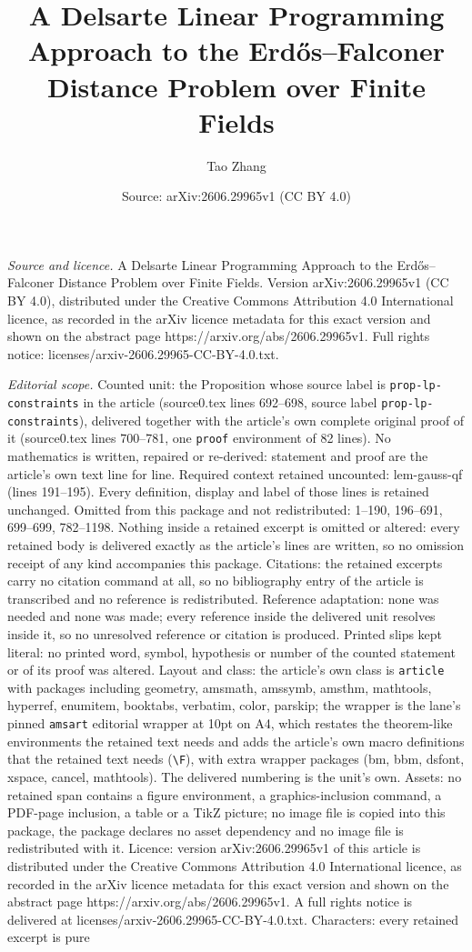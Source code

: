 \documentclass[10pt,a4paper]{amsart}
\title[A Delsarte Linear Programming Approach to the Erd\H{o}s--Fal]{A Delsarte Linear Programming Approach to the Erd\H{o}s--Falconer Distance Problem over Finite Fields}
\author{Tao Zhang}
\date{Source: arXiv:2606.29965v1 (CC BY 4.0)}
\begin{document}
\maketitle

\noindent\emph{Source and licence.} A Delsarte Linear Programming Approach to the Erd\H{o}s--Falconer Distance Problem over Finite Fields. Version arXiv:2606.29965v1 (CC BY 4.0), distributed under the Creative Commons Attribution 4.0 International licence, as recorded in the arXiv licence metadata for this exact version and shown on the abstract page https://arxiv.org/abs/2606.29965v1. Full rights notice: licenses/arxiv-2606.29965-CC-BY-4.0.txt.\par\smallskip

\noindent\textit{Editorial scope.} Counted unit: the Proposition whose source label is \texttt{prop-lp-constraints} in the article (source0.tex lines 692--698, source label \texttt{prop-lp-constraints}), delivered together with the article's own complete original proof of it (source0.tex lines 700--781, one \texttt{proof} environment of 82 lines). No mathematics is written, repaired or re-derived: statement and proof are the article's own text line for line. Required context retained uncounted: lem-gauss-qf (lines 191--195). Every definition, display and label of those lines is retained unchanged. Omitted from this package and not redistributed: 1--190, 196--691, 699--699, 782--1198. Nothing inside a retained excerpt is omitted or altered: every retained body is delivered exactly as the article's lines are written, so no omission receipt of any kind accompanies this package. Citations: the retained excerpts carry no citation command at all, so no bibliography entry of the article is transcribed and no reference is redistributed. Reference adaptation: none was needed and none was made; every reference inside the delivered unit resolves inside it, so no unresolved reference or citation is produced. Printed slips kept literal: no printed word, symbol, hypothesis or number of the counted statement or of its proof was altered. Layout and class: the article's own class is \texttt{article} with packages including geometry, amsmath, amssymb, amsthm, mathtools, hyperref, enumitem, booktabs, verbatim, color, parskip; the wrapper is the lane's pinned \texttt{amsart} editorial wrapper at 10pt on A4, which restates the theorem-like environments the retained text needs and adds the article's own macro definitions that the retained text needs (\texttt{\textbackslash F}), with extra wrapper packages (bm, bbm, dsfont, xspace, cancel, mathtools). The delivered numbering is the unit's own. Assets: no retained span contains a figure environment, a graphics-inclusion command, a PDF-page inclusion, a table or a TikZ picture; no image file is copied into this package, the package declares no asset dependency and no image file is redistributed with it. Licence: version arXiv:2606.29965v1 of this article is distributed under the Creative Commons Attribution 4.0 International licence, as recorded in the arXiv licence metadata for this exact version and shown on the abstract page https://arxiv.org/abs/2606.29965v1. A full rights notice is delivered at licenses/arxiv-2606.29965-CC-BY-4.0.txt. Characters: every retained excerpt is pure 
\end{document}
